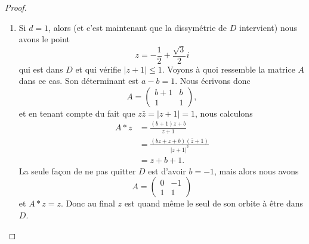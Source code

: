 \begin{proof}
\begin{subproof}
\begin{enumerate}
\begin{enumerate}
\begin{enumerate}
                                    \item
                                        Si \( d=1\), alors (et c'est maintenant que la dissymétrie de \( D\) intervient) nous avons le point
                                        \begin{equation}
                                            z=-\frac{ 1 }{2}+\frac{ \sqrt{3} }{2}i
                                        \end{equation}
                                        qui est dans \( D\) et qui vérifie \( | z+1 |\leq 1\). Voyons à quoi ressemble la matrice \( A\) dans ce cas. Son déterminant est \( a-b=1\). Nous écrivons donc
                                        \begin{equation}
                                            A=\begin{pmatrix}
                                                b+1    &   b    \\ 
                                                1    &   1    
                                            \end{pmatrix},
                                        \end{equation}
                                        et en tenant compte du fait que \( z\bar z=| z+1 |=1\), nous calculons
                                        \begin{subequations}
                                            \begin{align}
                                                A*z&=\frac{ (b+1)z+b }{ z+1 }\\
                                                &=\frac{ (bz+z+b)(\bar z+1) }{ | z+1 |^2 }\\
                                                &=z+b+1.
                                            \end{align}
                                        \end{subequations}
                                        La seule façon de ne pas quitter \( D\) est d'avoir \( b=-1\), mais alors nous avons
                                        \begin{equation}
                                            A=\begin{pmatrix}
                                                0    &   -1    \\ 
                                                1    &   1    
                                            \end{pmatrix}
                                        \end{equation}
                                        et \( A*z=z\). Donc au final \( z\) est quand même le seul de son orbite à être dans \( D\).


\end{enumerate}
\end{enumerate}
\end{enumerate}
\end{subproof}
\end{proof}
